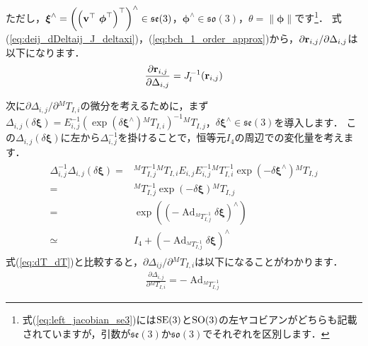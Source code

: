 %
ただし，$\boldsymbol \xi^{\wedge} = \left( \left( {\bf v}^{\top} ~ \boldsymbol \phi^{\top} \right)^{\top} \right)^{\wedge} \in \mathfrak{se}(3) $，$\boldsymbol \phi^{\wedge} \in \mathfrak{so}(3)$，$\theta = \| \boldsymbol \phi \|$です\footnote{式(\ref{eq:left_jacobian_se3})には${\rm SE}(3)$と${\rm SO(3)}$の左ヤコビアンがどちらも記載されていますが，引数が$\mathfrak{se}(3)$か$\mathfrak{so}(3)$でそれぞれを区別します．}．
式(\ref{eq:deij_dDeltaij_J_deltaxi})，(\ref{eq:bch_1_order_approx})から，$\partial {\bf r}_{i, j} / \partial \Delta_{i, j}$は以下になります．
%
\begin{align}
  \frac{ \partial {\bf r}_{i, j} }{ \partial \Delta_{i, j} } = J_{l}^{-1}( {\bf r}_{i, j} )
  \label{eq:deij_dDeltaij}
\end{align}
%

次に$\partial \Delta_{i, j} / \partial {}^{M}T_{I, i}$の微分を考えるために，まず$\Delta_{i, j} \left( \delta \boldsymbol \xi \right) = E_{i, j}^{-1} \left( \exp \left( \delta \boldsymbol \xi^{\wedge} \right) {}^{M}T_{I, i} \right)^{-1} {}^{M}T_{I, j}$，$\delta \boldsymbol \xi^{\wedge} \in \mathfrak{se}(3)$を導入します．
この$\Delta_{i, j} \left( \delta \boldsymbol \xi \right)$に左から$\Delta_{i, j}^{-1}$を掛けることで，恒等元$I_{4}$の周辺での変化量を考えます．
%
\begin{align}
  \begin{split}
    \Delta_{i, j}^{-1} \Delta_{i, j} \left( \delta \boldsymbol \xi \right)
%
    = & {}^{M}T_{I, j}^{-1} {}^{M}T_{I, i} E_{i, j} E_{i, j}^{-1} {}^{M}T_{I, i}^{-1} \exp \left( -\delta \boldsymbol \xi^{\wedge} \right) {}^{M}T_{I, j} \\
%
    = & {}^{M}T_{I, j}^{-1} \exp \left( -\delta \boldsymbol \xi \right) {}^{M}T_{I, j} \\
%
    = & \exp \left( \left( -\operatorname{Ad}_{ {}^{M}T_{I, j}^{-1} } \delta \boldsymbol \xi \right)^{\wedge} \right) \\
    \simeq & I_{4} + \left( -\operatorname{Ad}_{ {}^{M}T_{I, j}^{-1} } \delta \boldsymbol \xi \right)^{\wedge}
%
  \end{split}
\end{align}
%
式(\ref{eq:dT_dT})と比較すると，$\partial \Delta_{ij} / \partial {}^{M}T_{I, i}$は以下になることがわかります．
%
\begin{align}
  \frac{ \partial \Delta_{i, j} }{ \partial {}^{M}T_{I, i} } = - \operatorname{Ad}_{ {}^{M}T_{I, j}^{-1} }
  \label{eq:dDeltaij_dTi}
\end{align}
%

